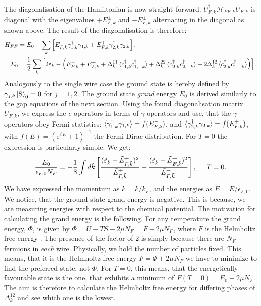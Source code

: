 The diagonalisation of the Hamiltonian is now straight forward. $U^\dagger_{F,k}\mathcal{H}_{FF,k}U_{F,k}$ is diagonal with the eigenvalues $+E^{\pm}_{F,k}$ and $-E^{\pm}_{F,k}$ alternating in the diagonal as shown above. The result of the diagonalisation is therefore:
\begin{align}
H_{FF} &= E_0 + \sum_{k} \left[ E^{-}_{F,k}\gamma^\dagger_{1, k}\gamma_{1, k} + E^{+}_{F,k}\gamma^\dagger_{2, k}\gamma_{2, k} \right], \nonumber \\ 
E_0 &= \frac{1}{2}\sum_k \left[2\varepsilon_k - \left( E^{-}_{F,k} + E^{+}_{F,k} + \Delta^{11}_k\braket{c^\dagger_{1,k}c^\dagger_{1,-k}} + \Delta^{22}_k\braket{c^\dagger_{2,k}c^\dagger_{2,-k}} + 2\Delta^{12}_k\braket{c^\dagger_{2,k}c^\dagger_{1,-k}} \right) \right]. 
\label{eq.2wiresDiagonalisedHamiltonian}
\end{align}  
Analogously to the single wire case the ground state is hereby defined by $\gamma_{j,k}\ket{\text{S}}_0 = 0$ for $j = 1, 2$. The ground state \textit{grand} energy $E_0$ is derived similarly to the gap equations of the next section. Using the found diagonalisation matrix $U_{F,k}$, we express the $c$-operators in terms of $\gamma$-operators and use, that the $\gamma$-operators obey Fermi statistics: $\braket{\gamma^\dagger_{1,k}\gamma_{1,k}} = f(E^{-}_{F,k})$, and $\braket{\gamma^\dagger_{2,k}\gamma_{2,k}} = f(E^{+}_{F,k})$, with $f(E) = (\text{e}^{\beta E} + 1)^{-1}$ the Fermi-Dirac distribution. For $T=0$ the expression is particularly simple. We get:
\begin{equation}
\frac{E_0}{\epsilon_{F,0} N_F} = -\frac{1}{8} \int d\tilde{k} \left[\frac{(\tilde{\varepsilon}_{\tilde{k}} - \tilde{E}^{+}_{F, \tilde{k}})^2}{\tilde{E}^{+}_{F, \tilde{k}}} + \frac{(\tilde{\varepsilon}_{\tilde{k}} - \tilde{E}^{-}_{F, \tilde{k}})^2}{\tilde{E}^{-}_{F, \tilde{k}}}\right], \hspace{0.5cm} T = 0. 
\label{eq.2wiresGrandGroundStateEnergy}
\end{equation}
We have expressed the momentum as $\tilde{k} = k/k_F$, and the energies as $\tilde{E} = E/\epsilon_{F,0}$. We notice, that the ground state grand energy is negative. This is because, we are measuring energies with respect to the chemical potential. The motivation for calculating the grand energy is the following. For any temperature the grand energy, $\Phi$, is given by $\Phi = U - TS - 2\mu N_F = F - 2\mu N_F$, where $F$ is the Helmholtz free energy \cite[pp. 161-162]{SchroederThermal}. The presence of the factor of 2 is simply because there are $N_F$ fermions in \textit{each} wire. Physically, we hold the number of particles fixed. This means, that it is the Helmholtz free energy $F = \Phi + 2\mu N_F$ we have to minimize to find the preferred state, not $\Phi$. For $T = 0$, this means, that the energetically favourable state is the one, that exhibits a minimum of $F(T = 0) = E_0 + 2\mu N_F$. The aim is therefore to calculate the Helmholtz free energy for differing phases of $\Delta^{12}_k$ and see which one is the lowest. 

